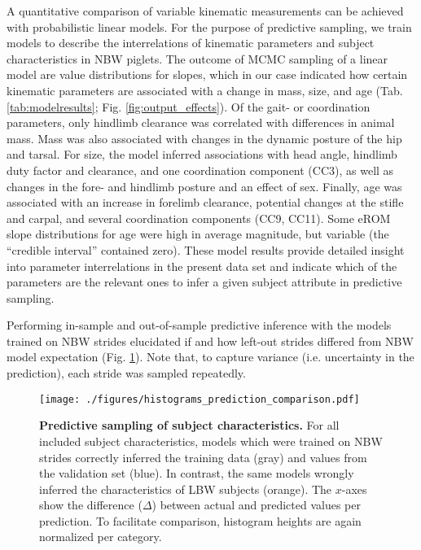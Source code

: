 A quantitative comparison of variable kinematic measurements can be achieved with probabilistic linear models.
For the purpose of predictive sampling, we train models to describe the interrelations of kinematic parameters and subject characteristics in NBW piglets.
The outcome of MCMC sampling of a linear model are value distributions for slopes, which in our case indicated how certain kinematic parameters are associated with a change in mass, size, and age (Tab. \ref{tab:modelresults}; Fig. \ref{fig:output_effects}).
Of the gait- or coordination parameters, only hindlimb clearance was correlated with differences in animal mass.
Mass was also associated with changes in the dynamic posture of the hip and tarsal.
For size, the model inferred associations with head angle, hindlimb duty factor and clearance, and one coordination component (CC3), as well as changes in the fore- and hindlimb posture and an effect of sex.
Finally, age was associated with an increase in forelimb clearance, potential changes at the stifle and carpal, and several coordination components (CC9, CC11).
Some eROM slope distributions for age were high in average magnitude, but variable (the ``credible interval'' contained zero).
These model results provide detailed insight into parameter interrelations in the present data set and indicate which of the parameters are the relevant ones to infer a given subject attribute in predictive sampling.



\FloatBarrier
Performing in-sample and out-of-sample predictive inference with the models trained on NBW strides elucidated if and how left-out strides differed from NBW model expectation (Fig. \ref{fig:predictions}).
Note that, to capture variance (i.e. uncertainty in the prediction), each stride was sampled repeatedly.

\begin{figure}[p]
\centering
\texttt{[image: ./figures/histograms\_prediction\_comparison.pdf]}
\caption{\label{fig:predictions}\textbf{Predictive sampling of subject characteristics.} For all included subject characteristics, models which were trained on NBW strides correctly inferred the training data (gray) and values from the validation set (blue). In contrast, the same models wrongly inferred the characteristics of LBW subjects (orange). The \(x\)-axes show the difference (\(\Delta\)) between actual and predicted values per prediction. To facilitate comparison, histogram heights are again normalized per category.}
\end{figure}


